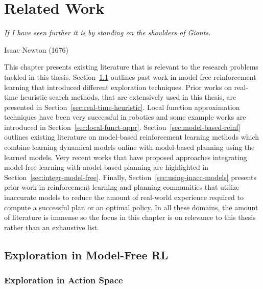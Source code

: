 
\chapter{Related Work}
\label{cha:related-work}

\epigraph{\textit{If I have seen further it is by standing on the
    shoulders of Giants.}}{Isaac Newton (1676)}

This chapter presents existing literature that is relevant
to the research problems tackled in this
thesis. Section~\ref{sec:expl-model-free} outlines past work in
model-free reinforcement learning that introduced different
exploration techniques. Prior works on real-time heuristic search
methods, that are extensively used 
in this thesis, are presented in
Section~\ref{sec:real-time-heuristic}. Local function approximation
techniques have been very successful in robotics and some example
works are introduced in
Section~\ref{sec:local-funct-appr}. Section~\ref{sec:model-based-reinf}
outlines existing literature on model-based reinforcement learning
methods which combine learning dynamical models online with model-based
planning using the learned models.
Very recent works that have proposed approaches integrating
model-free learning with model-based planning are highlighted in
Section~\ref{sec:integr-model-free}. Finally,
Section~\ref{sec:using-inacc-models} presents prior work in
reinforcement learning and planning communities that utilize
inaccurate models to reduce the amount of real-world experience
required to compute a successful plan or an optimal policy. In all
these domains, the amount of literature is immense so the focus in
this chapter is on relevance to this thesis rather than an exhaustive list.

\section{Exploration in Model-Free RL}
\label{sec:expl-model-free}


\subsection{Exploration in Action Space}
\label{sec:expl-acti-space}

